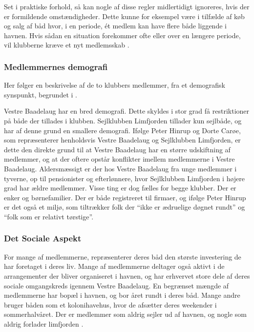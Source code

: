 Set i praktiske forhold, så kan nogle af disse regler midlertidigt ignoreres, hvis der er formildende omstændigheder. Dette kunne for eksempel være i tilfælde af køb og salg af båd hvor, i en periode, ét medlem kan have flere både liggende i havnen. Hvis sådan en situation forekommer ofte eller over en længere periode, vil klubberne kræve et nyt medlemsskab \cite{int_vb_sl}.

\subsubsection{Medlemmernes demografi}

Her følger en beskrivelse af de to klubbers medlemmer, fra et demografisk synspunkt, begrundet i \cite{int_vb_sl}.

Vestre Baadelaug har en bred demografi. Dette skyldes i stor grad få restriktioner på både der tillades i klubben. Sejlklubben Limfjorden tillader kun sejlbåde, og har af denne grund en smallere demografi. Ifølge Peter Hinrup og Dorte Carøe, som repræsenterer henholdsvis Vestre Baadelaug og Sejlklubben Limfjorden, er dette den direkte grund til at Vestre Baadelaug har en større udskiftning af medlemmer, og at der oftere opstår konflikter imellem medlemmerne i Vestre Baadelaug. Aldersmæssigt er der hos Vestre Baadelaug fra unge medlemmer i tyverne, op til pensionister og efterlønnere, hvor Sejlklubben Limfjorden i højere grad har ældre medlemmer. Visse ting er dog fælles for begge klubber. Der er enker og børnefamilier. Der er både registreret til firmaer, og ifølge Peter Hinrup er det også et miljø, som tiltrækker folk der \enquote{ikke er ædruelige døgnet rundt} og \enquote{folk som er relativt tørstige}.

\subsubsection{Det Sociale Aspekt}\label{social}

For mange af medlemmerne, repræsenterer deres båd den største investering de har foretaget i deres liv. Mange af medlemmerne deltager også aktivt i de arrangementer der bliver organiseret i havnen, og har erhvervet store dele af deres sociale omgangskreds igennem Vestre Baadelaug. En begrænset mængde af medlemmerne har bopæl i havnen, og bor året rundt i deres båd. Mange andre bruger båden som et kolonihavehus, hvor de afsætter deres weekender i sommerhalvåret. Der er medlemmer som aldrig sejler ud af havnen, og nogle som aldrig forlader limfjorden \cite{int_vb_sl}.

